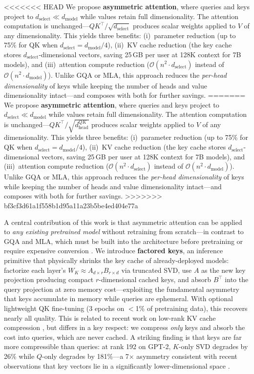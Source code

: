 \documentclass{article} %
\newcommand{\dmodel}{d_{\text{model}}}
\newcommand{\dselect}{d_{\text{select}}}
\newcommand{\BigO}{\mathcal{O}}
\begin{document}
<<<<<<< HEAD
We propose \textbf{asymmetric attention}, where queries and keys project to $\dselect \ll \dmodel$ while values retain full dimensionality. The attention computation is unchanged---$QK^\top / \sqrt{\dselect}$ produces scalar weights applied to $V$ of any dimensionality. This yields three benefits: (i)~parameter reduction (up to 75\% for QK when $\dselect = \dmodel/4$), (ii)~KV cache reduction (the key cache stores $\dselect$-dimensional vectors, saving 25\,GB per user at 128K context for 7B models), and (iii)~attention compute reduction ($\BigO(n^2 \cdot \dselect)$ instead of $\BigO(n^2 \cdot \dmodel)$). Unlike GQA or MLA, this approach reduces the \emph{per-head dimensionality} of keys while keeping the number of heads and value dimensionality intact---and composes with both for further savings.
=======
We propose \textbf{asymmetric attention}, where queries and keys project to $\dselect \ll \dmodel$ while values retain full dimensionality. The attention computation is unchanged---$QK^\top / \sqrt{d_{\text{head}}^{QK}}$ produces scalar weights applied to $V$ of any dimensionality. This yields three benefits: (i)~parameter reduction (up to 75\% for QK when $\dselect = \dmodel/4$), (ii)~KV cache reduction (the key cache stores $\dselect$-dimensional vectors, saving 25\,GB per user at 128K context for 7B models), and (iii)~attention compute reduction ($\BigO(n^2 \cdot \dselect)$ instead of $\BigO(n^2 \cdot \dmodel)$). Unlike GQA or MLA, this approach reduces the \emph{per-head dimensionality} of keys while keeping the number of heads and value dimensionality intact---and composes with both for further savings.
>>>>>>> bf3cf3d61a1f558b1d95a11a23b5be4ed404e77a

A central contribution of this work is that asymmetric attention can be applied to \emph{any existing pretrained model} without retraining from scratch---in contrast to GQA and MLA, which must be built into the architecture before pretraining or require expensive conversion \citep{mha2mla2025}. We introduce \textbf{factored keys}, an inference primitive that physically shrinks the key cache of already-deployed models: factorize each layer's $W_K \approx A_{d \times r} B_{r \times d}$ via truncated SVD, use $A$ as the new key projection producing compact $r$-dimensional cached keys, and absorb $B^\top$ into the query projection at zero memory cost---exploiting the fundamental asymmetry that keys accumulate in memory while queries are ephemeral. With optional lightweight QK fine-tuning (3 epochs on $<$1\% of pretraining data), this recovers nearly all quality. This is related to recent work on low-rank KV cache compression \citep{lrqk2025, svdllm2025, loki2024}, but differs in a key respect: we compress \emph{only} keys and absorb the cost into queries, which are never cached. A striking finding is that keys are far more compressible than queries: at rank 192 on GPT-2, $K$-only SVD degrades by 26\% while $Q$-only degrades by 181\%---a 7$\times$ asymmetry consistent with recent observations that key vectors lie in a significantly lower-dimensional space \citep{loki2024}.
\end{document}
